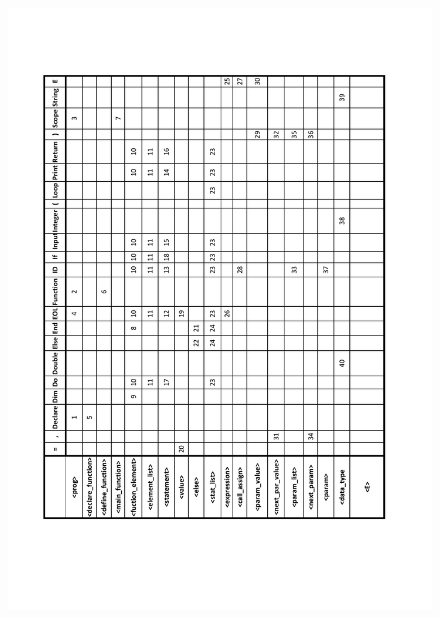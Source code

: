 \documentclass[11pt,a4paper]{article}
\begin{document}
	\begin{figure}
		\includegraphics[scale=0.8]{LL_table}
	\end{figure}
\end{document}
